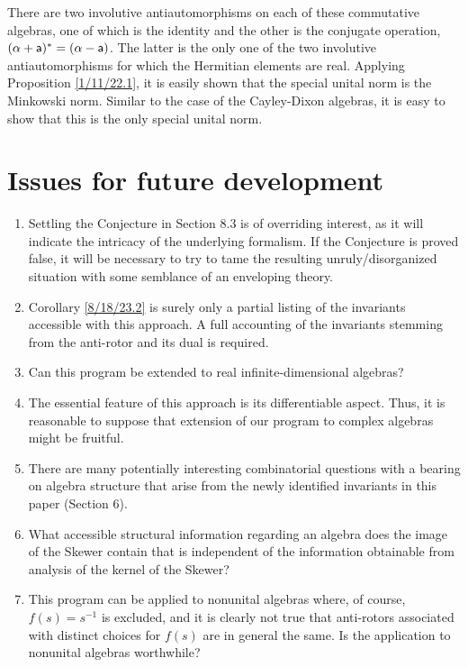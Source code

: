 \documentclass{amsart}
\theoremstyle{definition}
\numberwithin{theorem}{section}
\numberwithin{equation}{section}
\begin{document}
 There are two involutive antiautomorphisms on each of these commutative algebras, one of which is the identity and the other is the conjugate operation, $(\alpha+ {\sf a})^* = (\alpha- {\sf a})$. The latter is the only one of the two involutive antiautomorphisms  for which the Hermitian elements are real.  Applying Proposition \ref{1/11/22.1}, it is easily shown that the special unital norm is the Minkowski norm.  Similar to the case of the Cayley-Dixon algebras, it is easy to show that this is the only special unital norm.


\section{Issues for future development} 

\begin{enumerate}
\item Settling the Conjecture in Section 8.3 is of overriding interest, as it will indicate the intricacy of the underlying formalism.  If the Conjecture is proved false, it will be necessary to try to tame the resulting unruly/disorganized situation with some semblance of an enveloping theory.
\item Corollary \ref{8/18/23.2} is surely only a partial listing of the invariants accessible with this approach.  A full accounting of the invariants stemming from the anti-rotor and its dual is required.
\item Can this program be extended to real infinite-dimensional algebras?
\item The essential feature of this approach is its differentiable aspect.  Thus, it is reasonable to suppose that extension of our program to complex algebras might be fruitful. 
\item There are many potentially interesting combinatorial questions with a bearing on algebra structure that arise from the newly identified invariants in this paper (Section 6). \item What accessible structural information regarding an algebra does the image of the Skewer contain that is independent of the information obtainable from analysis of the kernel of the Skewer? 
\item This program can be applied to nonunital algebras where, of course, $f(s)=s^{-1}$ is excluded, and it is clearly not true that anti-rotors associated with distinct choices for $f(s)$ are in general the same.  Is the application to nonunital algebras worthwhile?
\end{enumerate}
\end{document}
